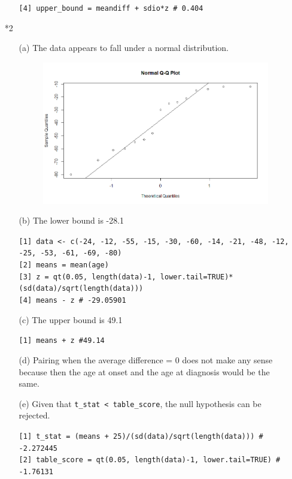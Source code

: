 \documentclass[12pt]{article}
\begin{document}
\begin{enumerate}
\begin{enumerate}
\begin{tcolorbox}[colback=white]
					\texttt{[4] upper\_bound = meandiff + sdio*z \# 0.404}\\
				\end{tcolorbox}
		\end{enumerate}
	\item[*2]
		\begin{enumerate}
			\item[(a)] The data appears to fall under a normal 
				distribution.
				\begin{figure}[!h]
					\includegraphics[width=\linewidth]{2b1.jpg}
				\end{figure}
				\newpage
			\item[(b)] The lower bound is -28.1
				\begin{tcolorbox}[colback=white]
					\texttt{[1] data <- c(-24, -12, -55, -15, -30, -60, -14, -21, -48, -12, -25, -53, -61, -69, -80)}\\
					\texttt{[2] means = mean(age)}\\
					\texttt{[3] z = qt(0.05, length(data)-1, lower.tail=TRUE)*(sd(data)/sqrt(length(data)))}\\
					\texttt{[4] means - z \# -29.05901}\\
				\end{tcolorbox}
			\item[(c)] The upper bound is 49.1
				\begin{tcolorbox}[colback=white]
					\texttt{[1] means + z \#49.14}
				\end{tcolorbox}
			\item[(d)] Pairing when the average difference = 0 does 
				not make any sense because then the age at onset 
				and the age at diagnosis would be the same.
			\item[(e)]  Given that  \texttt{t\_stat < table\_score}, the null hypothesis can be rejected.
				\begin{tcolorbox}[colback=white]
					\texttt{[1] t\_stat = (means + 25)/(sd(data)/sqrt(length(data))) \# -2.272445}\\
					\texttt{[2] table\_score = qt(0.05, length(data)-1, lower.tail=TRUE) \# -1.76131}\\
				\end{tcolorbox}
				

\end{enumerate}
\end{enumerate}
\end{document}
